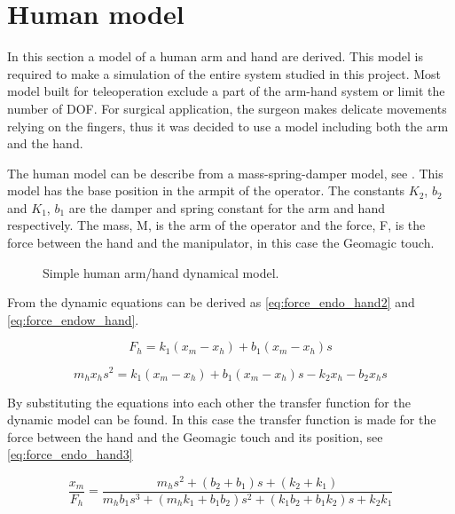 \section{Human model}
In this section a model of a human arm and hand are derived. This model is required to make a simulation of the entire system studied in this project. Most model built for teleoperation exclude a part of the arm-hand system\cite{lawrence1992stability} or limit the number of \gls{DOF}\cite{tsuji1994spatial}. For surgical application, the surgeon makes delicate movements relying on the fingers, thus it was decided to use a model including both the arm and the hand.

The human model can be describe from a mass-spring-damper model\cite{speich2005modeling}, see . This model has the base position in the armpit of the operator. The constants $K_2$, $b_2$ and $K_1$, $b_1$ are the damper and spring constant for the arm and hand respectively. The mass, M, is the arm of the operator and the force, F, is the force between the hand and the manipulator, in this case the Geomagic touch.

\begin{figure}[H]
\centering

\caption{Simple human arm/hand dynamical model.}
\label{fig:human_model}
\end{figure}


From  the dynamic equations can be derived as \eqref{eq:force_endo_hand2} and \eqref{eq:force_endow_hand}.

\begin{equation}
F_h = k_1(x_m-x_h)+b_1(x_m-x_h)s
\label{eq:force_endo_hand2}
\end{equation}

\begin{equation}
m_hx_hs^2 = k_1(x_m-x_h)+b_1(x_m-x_h)s-k_2x_h-b_2x_hs
\label{eq:force_endow_hand}
\end{equation}

By substituting the equations into each other the transfer function for the dynamic model can be found. In this case the transfer function is made for the force between the hand and the Geomagic touch and its position, see \eqref{eq:force_endo_hand3}

\begin{equation}
\frac{x_m}{F_h} = \frac{m_hs^2+(b_2+b_1)s+(k_2+k_1)}{m_hb_1s^3+(m_hk_1+b_1b_2)s^2+(k_1b_2+b_1k_2)s+k_2k_1}
\label{eq:force_endo_hand3}
\end{equation}

